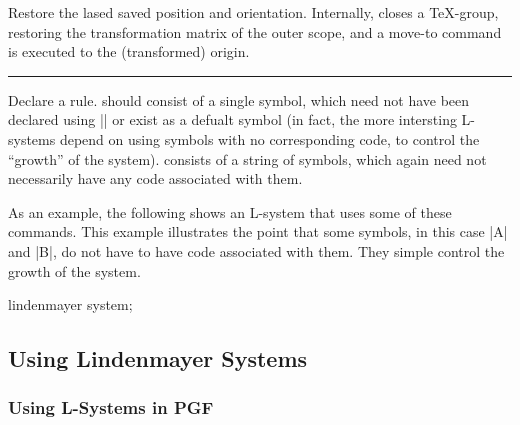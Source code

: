 \begin{command}{\pgfdeclarelindenmayersystem{}}
\begin{command}{\symbol{}}
\begin{command}{\pgflsystemrestorestate}
	Restore the lased saved position and orientation. Internally,
	\pgfname{} closes a \TeX-group, restoring the transformation 
	matrix of the outer scope, and a move-to command is executed to
	the (transformed) origin.
\end{command}
  

\end{command}

\begin{command}{\rule{\ttfamily\char`\{}}
  Declare a rule.  should consist of a single symbol, which
  need not have been declared using |\symbol| or exist as a defualt
  symbol (in fact, the more intersting L-systems depend on using
  symbols with no corresponding code, to control the ``growth'' of the
  system).
 	 consists of a string of symbols, which again need not
 	necessarily have any code associated with them.
 	
\end{command}

  As an example, the following shows an L-system that uses
  some of these commands. This example illustrates the point
  that some symbols, in this case |A| and |B|, do not have to 
  have code associated with them. They simple control the
  growth of the system.

\begin{codeexample}[pre={\nullfont\expandafter\let\csname pgf@lsystem@Hilbert curve\endcsname=\relax}]
\tikz\draw[lindenmayer system={Hilbert curve, axiom=A, order=4, angle=90}]
  lindenmayer system;
\end{codeexample}


\end{command}

\subsection{Using Lindenmayer Systems}
\subsubsection{Using L-Systems in PGF}

